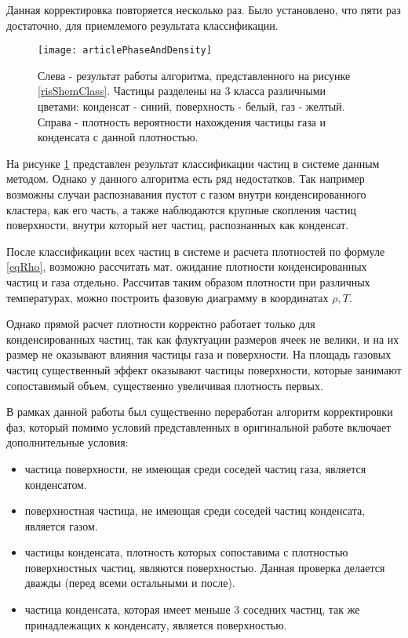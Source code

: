 Данная корректировка повторяется несколько раз. Было установлено, что пяти раз достаточно, для приемлемого результата классификации.


\begin{figure}[htbp!]
\begin{center}
\texttt{[image: articlePhaseAndDensity]}
\caption{Слева - результат работы алгоритма, представленного на рисунке \ref{risShemClass}. Частицы разделены на 3 класса различными цветами: конденсат - синий, поверхность - белый, газ - желтый. Справа - плотность вероятности нахождения частицы газа и конденсата с данной плотностью.}
\label{risClassification}
\end{center}
\end{figure}

На рисунке \ref{risClassification} представлен результат классификации частиц в системе данным методом. Однако у данного алгоритма есть ряд недостатков. Так например возможны случаи распознавания пустот с газом внутри конденсированного кластера, как его часть, а также наблюдаются крупные скопления частиц поверхности, внутри который нет частиц, распознанных как конденсат.


После классификации всех частиц в системе и расчета плотностей по формуле \ref{eqRho}, возможно рассчитать мат. ожидание плотности конденсированных частиц и газа отдельно.
Рассчитав таким образом плотности при различных температурах, можно построить фазовую диаграмму в координатах $\rho, T$.


Однако прямой расчет плотности корректно работает только для конденсированных частиц, так как флуктуации размеров ячеек не велики, и на их размер не оказывают влияния частицы газа и поверхности. На площадь газовых частиц существенный эффект оказывают частицы поверхности, которые занимают сопоставимый объем, существенно увеличивая плотность первых.


В рамках данной работы был существенно переработан алгоритм корректировки фаз, который помимо условий представленных в оригинальной работе включает дополнительные условия:
\begin{itemize}
\item частица поверхности, не имеющая среди соседей частиц газа, является конденсатом.
\item поверхностная частица, не имеющая среди соседей частиц конденсата, является газом.

\item частицы конденсата, плотность которых сопоставима с плотностью поверхностных частиц, являются поверхностью. Данная проверка делается дважды (перед всеми остальными и после).

\item частица конденсата, которая имеет меньше 3 соседних частиц, так же принадлежащих к конденсату, является поверхностью.
\end{itemize}


